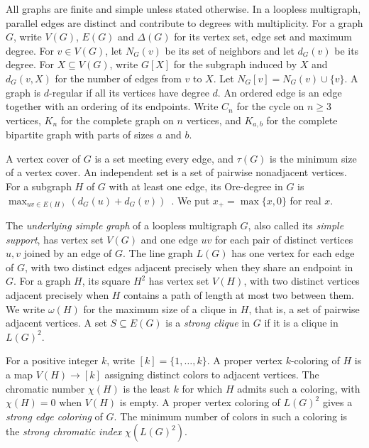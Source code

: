 \documentclass[preprint,11pt,numbers]{elsarticle-arxiv}
\numberwithin{equation}{section}
\theoremstyle{definition}
\begin{document}
All graphs are finite and simple unless stated otherwise. In a loopless
multigraph, parallel edges are distinct and contribute to degrees with
multiplicity. For a graph $G$, write $V(G)$, $E(G)$ and $\Delta(G)$ for
its vertex set, edge set and maximum degree. For $v\in V(G)$, let
$N_G(v)$ be its set of neighbors and let $d_G(v)$ be its degree.
For $X\subseteq V(G)$, write $G[X]$ for the subgraph induced by $X$ and
$d_G(v,X)$ for the number of edges from $v$ to $X$. Let $N_G[v]=N_G(v)\cup\{v\}$.
A graph is
$d$-regular if all its vertices have degree $d$. An ordered edge is an
edge together with an ordering of its endpoints.
Write $C_n$ for the cycle on $n\geq 3$ vertices, $K_n$ for the complete
graph on $n$ vertices, and $K_{a,b}$ for the complete bipartite graph with
parts of sizes $a$ and $b$.

A vertex cover of $G$ is a set meeting every edge, and $\tau(G)$ is
the minimum size of a vertex cover. An independent set is a set of
pairwise nonadjacent vertices. For a subgraph $H$ of $G$ with at least
one edge, its Ore-degree in $G$ is
$\max_{uv\in E(H)}(d_G(u)+d_G(v))$~\cite{FaronPostle2019}.
We put $x_+=\max\{x,0\}$ for real $x$.

The \emph{underlying simple graph} of a loopless multigraph $G$, also
called its \emph{simple support}, has vertex set $V(G)$ and one edge
$uv$ for each pair of distinct vertices $u,v$ joined by an edge of $G$.
The line graph $L(G)$ has
one vertex for each edge of $G$, with two distinct edges adjacent
precisely when they share an endpoint in $G$. For a graph $H$,
its square $H^2$ has vertex set $V(H)$, with two distinct vertices
adjacent precisely when $H$ contains a path of length at most two
between them. We write $\omega(H)$ for the maximum size of a clique in
$H$, that is, a set of pairwise adjacent vertices. A set
$S\subseteq E(G)$ is a \emph{strong clique} in $G$ if it is a clique
in $L(G)^2$.

For a positive integer $k$, write $[k]=\{1,\ldots,k\}$. A proper vertex
$k$-coloring of $H$ is a map $V(H)\to[k]$ assigning distinct colors to
adjacent vertices. The chromatic number $\chi(H)$ is the least $k$ for
which $H$ admits such a coloring, with $\chi(H)=0$ when $V(H)$ is empty.
A proper vertex coloring of $L(G)^2$ gives a \emph{strong edge
coloring} of $G$. The minimum number of colors in such a coloring is
the \emph{strong chromatic index} $\chi(L(G)^2)$.
\end{document}

